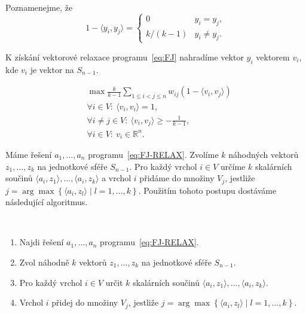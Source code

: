 \noindent Poznamenejme, že
$$
    1 - \langle y_i, y_j \rangle = 
    \begin{cases}
        0           & y_i = y_j, \\
        k / (k - 1) & y_i \neq y_j.
    \end{cases}
$$

\noindent K získání vektorové relaxace programu~\ref{eq:FJ} nahradíme vektor $y_i$ vektorem $v_i$, kde $v_i$ je vektor na $S_{n-1}$.

\begin{equation}\tag{FJ-RELAX}
    \begin{split}
        &\max \frac{k}{k-1} \sum_{1 \leq i < j \leq n} w_{ij} (1 - \langle v_i, v_j \rangle) \\
        &\forall i \in V:\ \langle v_i, v_i \rangle = 1, \\
        &\forall i \neq j \in V:\ \langle v_i, v_j \rangle \geq -\frac{1}{k-1}, \\
        &\forall i \in V:\ v_i \in \mathbb{R}^n.
    \end{split}
    \label{eq:FJ-RELAX}
\end{equation}


Máme řešení $a_1, \dots, a_n$ programu~\ref{eq:FJ-RELAX}. Zvolíme $k$ náhodných vektorů $z_1, \dots, z_k$ na jednotkové sféře $S_{n-1}$. Pro každý vrchol $i \in V$ určíme $k$ skalárních součinů $\langle a_i, z_1 \rangle, \dots, \langle a_i, z_k \rangle$ a vrchol $i$ přidáme do množiny $V_j$, jestliže $j = \arg \max \left\{ \langle a_i, z_l \rangle \mid l = 1, \dots, k \right\}$. Použitím tohoto postupu dostáváme následující algoritmus.

\begin{alg}$ $
    \begin{enumerate}
        \item Najdi řešení $a_1, \dots, a_n$ programu~\ref{eq:FJ-RELAX}.
        \item Zvol náhodně $k$ vektorů $z_1, \dots, z_k$ na jednotkové sféře $S_{n-1}$.
        \item Pro každý vrchol $i \in V$ určit $k$ skalárních součinů $\langle a_i, z_1 \rangle, \dots, \langle a_i, z_k \rangle$.
        \item Vrchol $i$ přidej do množiny $V_j$, jestliže $j = \arg \max \left\{ \langle a_i, z_l \rangle \mid l = 1, \dots, k \right\}$.
    \end{enumerate}
    \label{alg:fj-max-k-cut}
\end{alg}


